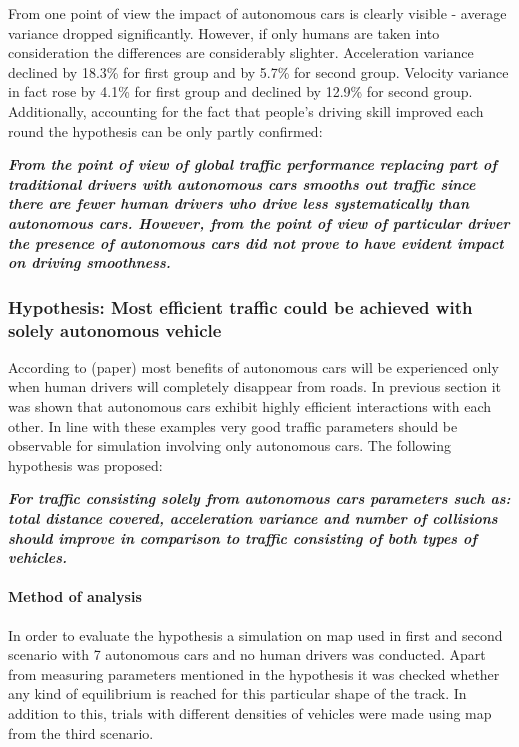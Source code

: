 \documentclass[11pt,english]{article}
\begin{document}
From one point of view the impact of autonomous cars is clearly visible - average variance dropped significantly. However, if only humans are taken into consideration the differences are considerably slighter. Acceleration variance declined by 18.3\% for first group and by 5.7\% for second group. Velocity variance in fact rose by 4.1\% for first group and declined by 12.9\% for second group. Additionally, accounting for the fact that people's driving skill improved each round the hypothesis can be only partly confirmed:

\textbf{\textit{From the point of view of global traffic performance replacing part of traditional drivers with autonomous cars smooths out traffic since there are fewer human drivers who drive less systematically than autonomous cars. However, from the point of view of particular driver the presence of autonomous cars did not prove to have evident impact on driving smoothness.}}





\subsubsection{Hypothesis: Most efficient traffic could be achieved with solely autonomous vehicle}

According to (paper) most benefits of autonomous cars will be experienced only when human drivers will completely disappear from roads. In previous section it was shown that autonomous cars exhibit highly efficient interactions with each other. In line with these examples very good traffic parameters should be observable for simulation involving only autonomous cars. The following hypothesis was proposed:

\textbf{\textit{For traffic consisting solely from autonomous cars parameters such as: total distance covered, acceleration variance and number of collisions should improve in comparison to traffic consisting of both types of vehicles.}}

\paragraph{Method of analysis}
In order to evaluate the hypothesis a simulation on map used in first and second scenario with 7 autonomous cars and no human drivers was conducted. Apart from measuring parameters mentioned in the hypothesis it was checked whether any kind of equilibrium is reached for this particular shape of the track. In addition to this, trials with different densities of vehicles were made using map from the third scenario. 
\end{document}
